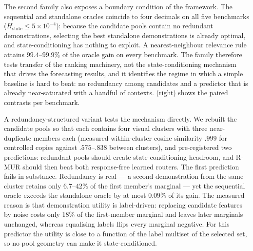 The second family also exposes a boundary condition of the framework. The
sequential and standalone oracles coincide to four decimals on all five
benchmarks ($H_{\mathrm{state}}\le 5\times10^{-4}$): because the candidate
pools contain no redundant demonstrations, selecting the best standalone
demonstrations is already optimal, and state-conditioning has nothing to
exploit. A nearest-neighbour relevance rule attains $99.4$--$99.9\%$ of the
oracle gain on every benchmark. The family therefore tests transfer of the
ranking machinery, not the state-conditioning mechanism that drives the
forecasting results, and it identifies the regime in which a simple baseline is
hard to beat: no redundancy among candidates and a predictor that is already
near-saturated with a handful of contexts.  (right) shows
the paired contrasts per benchmark.

A redundancy-structured variant tests the mechanism directly. We rebuilt the
candidate pools so that each contains four visual clusters with three
near-duplicate members each (measured within-cluster cosine similarity $.999$
for controlled copies against $.575$--$.838$ between clusters), and
pre-registered two predictions: redundant pools should create state-conditioning
headroom, and R-MUR should then beat both response-free learned routers. The
first prediction fails in substance. Redundancy is real --- a second
demonstration from the same cluster retains only $6.7$--$42\%$ of the first
member's marginal --- yet the sequential oracle exceeds the standalone oracle
by at most $0.09\%$ of its gain. The measured reason is that demonstration
utility is label-driven: replacing candidate features by noise costs only
$18\%$ of the first-member marginal and leaves later marginals unchanged,
whereas equalising labels flips every marginal negative. For this predictor the
utility is close to a function of the label multiset of the selected set, so no
pool geometry can make it state-conditioned.

